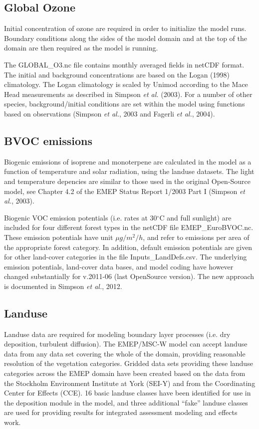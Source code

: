 \subsection{Global Ozone}

Initial concentration of ozone are required in order to
initialize the model runs. Boundary conditions along the sides of the model
domain and at the top of the domain are then required as the model is
running.

The GLOBAL\_O3.nc file contains monthly averaged fields in netCDF format. 
The initial and background
concentrations are based on the Logan (1998) climatology. The Logan
climatology is scaled by Unimod according to the Mace Head measurements as
described in Simpson {\sl et al.} (2003). For a number of other species, 
background/initial conditions are set within the model using functions 
based on observations (Simpson {\sl et al.}, 2003 and Fagerli {\sl et al.}, 2004).



\subsection{BVOC emissions}

Biogenic emissions of isoprene and monoterpene are calculated in the
model as a function of temperature and solar radiation, using the landuse
datasets. The light and temperature depencies are similar to those
used in the original Open-Source model, see 
Chapter 4.2 of the EMEP Status Report 1/2003 Part I (Simpson
{\sl et al.}, 2003).

Biogenic VOC emission potentials (i.e. rates at 30$^\circ$C and full sunlight)
are included for four different forest types in the netCDF file 
EMEP\_EuroBVOC.nc. These emission potentials have unit $\mu g/m^{2} /h$, and
refer to emissions per area of the appropriate forest category. In 
addition, default emission potentials are given for other
land-cover categories in the file Inputs\_LandDefs.csv. 
The underlying emission potentials, land-cover data bases, and model
coding have however changed substantially for v.2011-06 (last OpenSource version). The new approach
is documented in Simpson {\sl et al.}, 2012.

\subsection{Landuse}

Landuse data are required for modeling boundary layer processes
(i.e. dry deposition, turbulent diffusion).
The EMEP/MSC-W model can accept landuse data from any
data set covering the whole of the domain, providing reasonable 
resolution of the vegetation categories. Gridded data sets providing
these landuse categories across the EMEP domain have been created
based on the data from the Stockholm Environment Institute at York 
(SEI-Y) and from the Coordinating Center for Effects (CCE). 
16 basic landuse classes have been identified for use in the
deposition module in the model, and three additional ``fake'' landuse
classes are used for providing results for integrated assessment
modeling and effects work.

